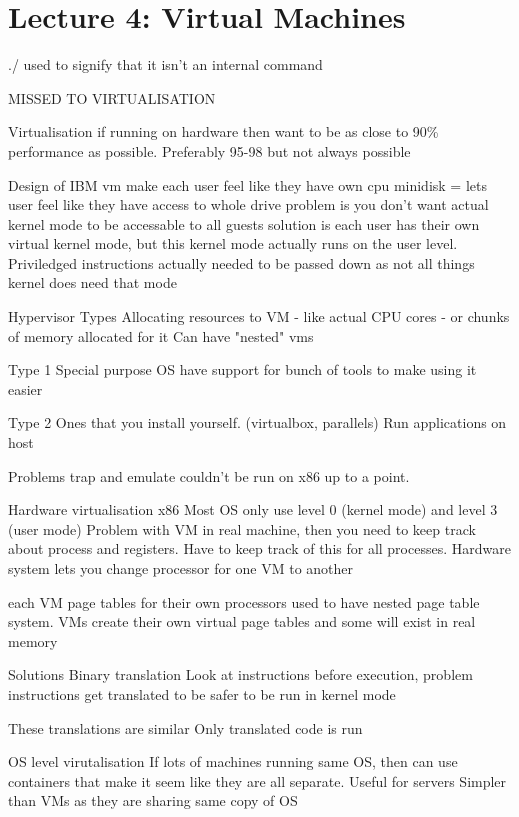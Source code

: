 \documentclass{article}
\begin{document}
\section{Lecture 4: Virtual Machines}
	./ used to signify that it isn't an internal command

	MISSED TO VIRTUALISATION

	Virtualisation
		if running on hardware then want to be as close to 90\% performance as possible. Preferably 95-98 but not always possible

	Design of IBM vm
		make each user feel like they have own cpu
		minidisk = lets user feel like they have access to whole drive
		problem is you don't want actual kernel mode to be accessable to all guests
			solution is each user has their own virtual kernel mode, but this kernel mode actually runs on the user level.
			Priviledged instructions actually needed to be passed down as not all things kernel does need that mode

	Hypervisor Types
		Allocating resources to VM 
			- like actual CPU cores
			- or chunks of memory allocated for it
		Can have "nested" vms

		Type 1
			Special purpose OS
			have support for bunch of tools to make using it easier

		Type 2
			Ones that you install yourself. (virtualbox, parallels)
			Run applications on host

	Problems
		trap and emulate couldn't be run on x86 up to a point.


	Hardware virtualisation x86
		Most OS only use level 0 (kernel mode) and level 3 (user mode)
		Problem with VM in real machine, then you need to keep track about process and registers. Have to keep track of this for all processes.
			Hardware system lets you change processor for one VM to another

		each VM page tables for their own processors
			used to have nested page table system. VMs create their own virtual page tables and some will exist in real memory

	Solutions
		Binary translation
			Look at instructions before execution, problem instructions get translated to be safer to be run in kernel mode

			These translations are similar
			Only translated code is run

	OS level virutalisation
		If lots of machines running same OS, then can use containers that make it seem like they are all separate. 
		Useful for servers
		Simpler than VMs as they are sharing same copy of OS
\end{document}
